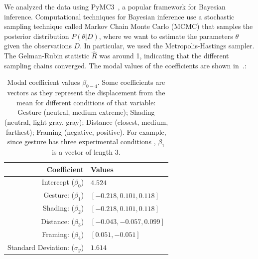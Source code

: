 We analyzed the data using PyMC3~\cite{Salvatier2016}, a popular framework for Bayesian inference. Computational techniques for Bayesian inference use a stochastic sampling technique called Markov Chain Monte Carlo (MCMC) that samples the posterior distribution $P(\theta | D)$, where we want to estimate the parameters $\theta$ given the observations $D$. In particular, we used the Metropolis-Hastings sampler. The Gelman-Rubin statistic $\hat{R}$ was around 1, indicating that the different sampling chains converged. The modal values of the coefficients are shown in~.:

\begin{table}[htb]%
 \centering
 \caption{Modal coefficient values $\beta_{0-4}$. Some coefficients are vectors as they represent the displacement from the mean for different conditions of that variable: Gesture (neutral, medium extreme); Shading (neutral, light gray, gray); Distance (closest, medium, farthest); Framing (negative, positive). For example, since gesture has three experimental conditions , $\beta_1$ is a vector of length 3.}\label{tab:modal values}
 \begin{tabular}{@{}rl@{}} \toprule
  Coefficient                                       & Values                     \\ \midrule
  Intercept ($\beta_0$)                             & $4.524$                    \\
  Gesture:  ($\beta_1$)   & $[-0.218, 0.101, 0.118]$   \\
  Shading:  ($\beta_2$)  & $ [-0.218 , 0.101, 0.118]$ \\
  Distance:  ($\beta_3$) & $[-0.043, -0.057, 0.099]$  \\
  Framing: ($\beta_4$)         & $[ 0.051, -0.051]$         \\
  Standard Deviation: ($\sigma_y$)                   & $1.614$                    \\ \bottomrule
 \end{tabular}
\end{table}


